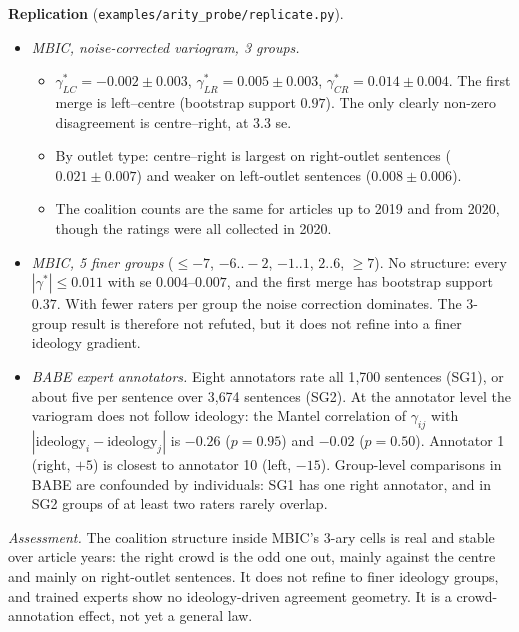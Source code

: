 \documentclass[11pt]{article}
\theoremstyle{definition}
\theoremstyle{remark}
\begin{document}
\textbf{Replication} (\texttt{examples/arity\_probe/replicate.py}).
\begin{itemize}
  \item \emph{MBIC, noise-corrected variogram, 3 groups.}
    \begin{itemize}
      \item $\gamma^*_{LC}=-0.002\pm0.003$, $\gamma^*_{LR}=0.005\pm0.003$, $\gamma^*_{CR}=0.014\pm0.004$. The first merge is left--centre (bootstrap support $0.97$). The only clearly non-zero disagreement is centre--right, at 3.3 se.
      \item By outlet type: centre--right is largest on right-outlet sentences ($0.021\pm0.007$) and weaker on left-outlet sentences ($0.008\pm0.006$).
      \item The coalition counts are the same for articles up to 2019 and from 2020, though the ratings were all collected in 2020.
    \end{itemize}
  \item \emph{MBIC, 5 finer groups} ($\le-7$, $-6..-2$, $-1..1$, $2..6$, $\ge7$). No structure: every $|\gamma^*|\le0.011$ with se $0.004$--$0.007$, and the first merge has bootstrap support $0.37$. With fewer raters per group the noise correction dominates. The 3-group result is therefore not refuted, but it does not refine into a finer ideology gradient.
  \item \emph{BABE expert annotators.} Eight annotators rate all 1{,}700 sentences (SG1), or about five per sentence over 3{,}674 sentences (SG2). At the annotator level the variogram does not follow ideology: the Mantel correlation of $\gamma_{ij}$ with $|\text{ideology}_i-\text{ideology}_j|$ is $-0.26$ ($p=0.95$) and $-0.02$ ($p=0.50$). Annotator 1 (right, $+5$) is closest to annotator 10 (left, $-15$). Group-level comparisons in BABE are confounded by individuals: SG1 has one right annotator, and in SG2 groups of at least two raters rarely overlap.
\end{itemize}
\noindent\emph{Assessment.} The coalition structure inside MBIC's 3-ary cells is real and stable over article years: the right crowd is the odd one out, mainly against the centre and mainly on right-outlet sentences. It does not refine to finer ideology groups, and trained experts show no ideology-driven agreement geometry. It is a crowd-annotation effect, not yet a general law.
\end{document}
